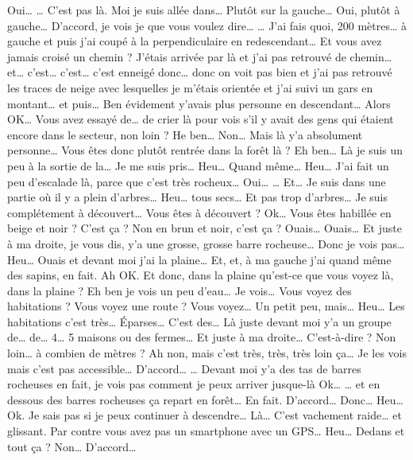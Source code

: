 \begin{dialogue}
  \Sec {} Oui…
  \Req … C'est pas là. Moi je suis allée dans… Plutôt sur la gauche…
  \Sec {} Oui, plutôt à gauche… D'accord,
  je vois je que vous voulez dire…
  \Req … J'ai fais quoi, 200 mètres… à gauche et puis j'ai coupé à la
  perpendiculaire en redescendant…
  \Sec {} Et vous avez jamais croisé un
  chemin ?
  \Req J'étais arrivée par là et j'ai pas retrouvé de chemin… et…
  c'est… c'est… c'est enneigé donc… donc on voit pas bien et j'ai pas
  retrouvé les traces de neige avec lesquelles je m'étais orientée et
  j'ai suivi un gars en montant… et puis… Ben évidement y'avais plus
  personne en descendant…
  \Sec {} Alors OK… Vous avez essayé de… de
  crier là pour vois s'il y avait des gens qui étaient encore dans le
  secteur, non loin ?
  \Req He ben… Non… Mais là y'a absolument personne…
  \Sec {} Vous êtes donc plutôt rentrée dans
  la forêt là ?
  \Req Eh ben… Là je suis un peu à la sortie de la… Je me suis pris…
  Heu… Quand même… Heu… J'ai fait un peu d'escalade là, parce que
  c'est très rocheux…
  \Sec {} Oui…
  \Req … Et… Je suis dans une partie où il y a plein d'arbres… Heu…
  tous secs… Et pas trop d'arbres… Je suis complétement à découvert…
  \Sec {} Vous êtes à découvert ? Ok… Vous
  êtes habillée en beige et noir ? C'est ça ? Non en brun et noir,
  c'est ça ?
  \Req Ouais… Ouais… Et juste à ma droite, je vous dis, y'a une
  grosse, grosse barre rocheuse… Donc je vois pas… Heu… Ouais et
  devant moi j'ai la plaine… Et, et, à ma gauche j'ai quand même des
  sapins, en fait.
  \Sec Ah OK. Et donc, dans la plaine qu'est-ce que vous voyez là,
  dans la plaine ?
  \Req Eh ben je vois un peu d'eau… Je vois…
  \Sec {} Vous voyez des habitations ? Vous
  voyez une route ? Vous voyez…
  \Req Un petit peu, mais… Heu… Les habitations c'est très… Éparses…
  C'est des… Là juste devant moi y'a un groupe de… de… 4… 5 maisons ou
  des fermes… Et juste à ma droite…
  \Sec {} C'est-à-dire ? Non loin… à combien
  de mètres ?
  \Req Ah non, mais c'est très, très, très loin ça… Je les vois mais
  c'est pas accessible…
  \Sec {} D'accord…
  \Req … Devant moi y'a des tas de barres rocheuses en fait, je vois
  pas comment je peux arriver jusque-là
  \Sec {} Ok…
  \Req … et en dessous des barres rocheuses ça repart en forêt… En
  fait.
  \Sec D'accord… Donc… Heu… Ok.
  \Req Je sais pas si je peux continuer à descendre… Là… C'est
  vachement raide… et glissant.
  \Sec Par contre vous avez pas un smartphone avec un GPS… Heu… Dedans
  et tout ça ?
  \Req Non…
  \Sec D'accord…
\end{dialogue}